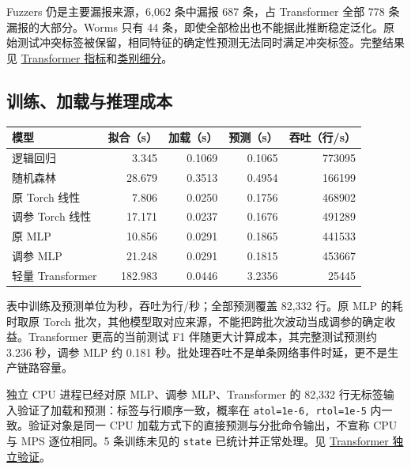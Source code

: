 \documentclass[UTF8,a4paper,11pt,fontset=fandol]{ctexart}
\newcounter{none}
\begin{document}
Fuzzers 仍是主要漏报来源，6,062 条中漏报 687 条，占 Transformer 全部 778
条漏报的大部分。Worms 只有 44
条，即使全部检出也不能据此推断稳定泛化。原始测试冲突标签被保留，相同特征的确定性预测无法同时满足冲突标签。完整结果见
\href{https://github.com/ZureTz/ml-network-intrusion-detection/blob/master/reports/results/torch-tune-20261105/evaluation/transformer/metrics.json}{Transformer
指标}和\href{https://github.com/ZureTz/ml-network-intrusion-detection/blob/master/reports/results/torch-tune-20261105/evaluation/transformer/category_breakdown.csv}{类别细分}。

\subsection{训练、加载与推理成本}\label{ux8badux7ec3ux52a0ux8f7dux4e0eux63a8ux7406ux6210ux672c}


{\def\LTcaptype{none} %
\begin{longtable}[]{@{}lrrrr@{}}
\toprule\noalign{}
模型 & 拟合（s） & 加载（s） & 预测（s） & 吞吐（行/s） \\
\midrule\noalign{}
\endhead
\bottomrule\noalign{}
\endlastfoot
逻辑回归 & 3.345 & 0.1069 & 0.1065 & 773095 \\
随机森林 & 28.679 & 0.3513 & 0.4954 & 166199 \\
原 Torch 线性 & 7.806 & 0.0250 & 0.1756 & 468902 \\
调参 Torch 线性 & 17.171 & 0.0237 & 0.1676 & 491289 \\
原 MLP & 10.856 & 0.0291 & 0.1865 & 441533 \\
调参 MLP & 21.248 & 0.0291 & 0.1815 & 453667 \\
轻量 Transformer & 182.983 & 0.0446 & 3.2356 & 25445 \\
\end{longtable}
}

表中训练及预测单位为秒，吞吐为行/秒；全部预测覆盖 82,332 行。原 MLP
的耗时取原 Torch
批次，其他模型取对应来源，不能把跨批次波动当成调参的确定收益。Transformer
更高的当前测试 F1 伴随更大计算成本，其完整测试预测约 3.236 秒，调参 MLP
约 0.181 秒。批处理吞吐不是单条网络事件时延，更不是生产链路容量。

独立 CPU 进程已经对原 MLP、调参 MLP、Transformer 的 82,332
行无标签输入验证了加载和预测：标签与行顺序一致，概率在
\texttt{atol=1e-6,\ rtol=1e-5} 内一致。验证对象是同一 CPU
加载方式下的直接预测与分批命令输出，不宣称 CPU 与 MPS 逐位相同。5
条训练未见的 \texttt{state} 已统计并正常处理。见
\href{https://github.com/ZureTz/ml-network-intrusion-detection/blob/master/reports/results/torch-tune-20261105/verification/transformer/verification.json}{Transformer
独立验证}。
\end{document}
